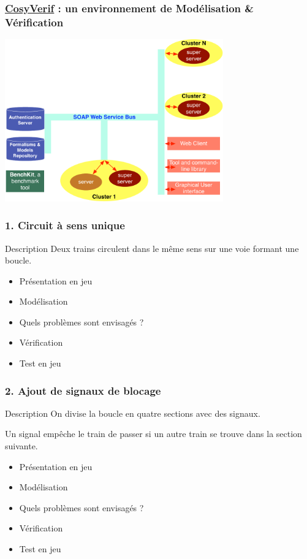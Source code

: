 \documentclass[french]{beamer}
\begin{document}
\begin{frame}
  \frametitle{\href{http://cosyverif.org}{CosyVerif} :
  un environnement de Modélisation \& Vérification}
  \begin{center}
  \includegraphics[height=7cm]{images/architecture.pdf}
  \end{center}
\end{frame}

\begin{frame}
  \frametitle{1. Circuit à sens unique}
  \begin{block}{Description}
  Deux trains circulent dans le même sens sur une voie formant une boucle.
  \end{block}

  \begin{itemize}
  \item Présentation en jeu
  \item Modélisation
  \item Quels problèmes sont envisagés ?
  \item Vérification
  \item Test en jeu
  \end{itemize}
\end{frame}

\begin{frame}
  \frametitle{2. Ajout de signaux de blocage}
  \begin{block}{Description}
  On divise la boucle en quatre sections avec des signaux.

  Un signal empêche le train de passer si un autre train se trouve dans la section suivante.
  \end{block}

  \begin{itemize}
  \item Présentation en jeu
  \item Modélisation
  \item Quels problèmes sont envisagés ?
  \item Vérification
  \item Test en jeu
  \end{itemize}
\end{frame}
\end{document}
